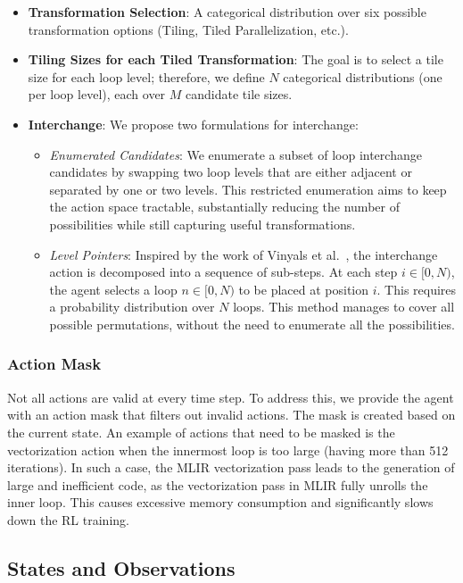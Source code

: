 \documentclass[10pt,twocolumn]{article}
\begin{document}
\begin{itemize}
\item \textbf{Transformation Selection}: A categorical distribution over six possible transformation options (Tiling, Tiled Parallelization, etc.).
\item \textbf{Tiling Sizes for each Tiled Transformation}: The goal is to select a tile size for each loop level; therefore, we define $N$ categorical distributions (one per loop level), each over $M$ candidate tile sizes.
\item \textbf{Interchange}: We propose two formulations for interchange:
\begin{itemize}
\item \emph{Enumerated Candidates}: We enumerate a subset of loop interchange candidates by swapping two loop levels that are either adjacent or separated by one or two levels. This restricted enumeration aims to keep the action space tractable, substantially reducing the number of possibilities while still capturing useful transformations.
\item \emph{Level Pointers}: Inspired by the work of Vinyals et al.~\cite{ref52}, the interchange action is decomposed into a sequence of sub-steps. At each step $i \in [0, N)$, the agent selects a loop $n \in [0, N)$ to be placed at position $i$. This requires a probability distribution over $N$ loops. This method manages to cover all possible permutations, without the need to enumerate all the possibilities.
\end{itemize}
\end{itemize}

\subsubsection{Action Mask}
Not all actions are valid at every time step. To address this, we provide the agent with an action mask that filters out invalid actions. The mask is created based on the current state. An example of actions that need to be masked is the vectorization action when the innermost loop is too large (having more than 512 iterations). In such a case, the MLIR vectorization pass leads to the generation of large and inefficient code, as the vectorization pass in MLIR fully unrolls the inner loop. This causes excessive memory consumption and significantly slows down the RL training.

\subsection{States and Observations}
\label{sec:states}
\end{document}
